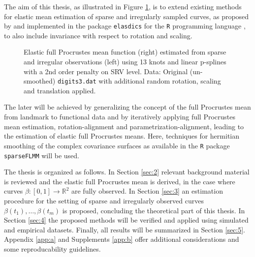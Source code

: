 The aim of this thesis, as illustrated in Figure \ref{fig:1-mean}, is to extend existing methods for elastic mean estimation of sparse and irregularly sampled curves, as proposed by \cite{Steyer2021} and implemented in the package \texttt{elasdics} \parencite{elasdics} for the \texttt{R} programming language \parencite{R}, to also include invariance with respect to rotation and scaling.
\begin{figure}
  \centering
  \begin{subfigure}{.48\textwidth}
    \centering
  \end{subfigure}\hfill%
  \begin{subfigure}{.48\textwidth}
    \centering
  \end{subfigure}
  \caption{Elastic full Procrustes mean function (right) estimated from sparse and irregular observations (left) using 13 knots and linear p-splines with a 2nd order penalty on SRV level. Data: Original (un-smoothed) \texttt{digits3.dat} with additional random rotation, scaling and translation applied.}
  \label{fig:1-mean}
\end{figure}
The later will be achieved by generalizing the concept of the full Procrustes mean from landmark to functional data and by iteratively applying full Procrustes mean estimation, rotation-alignment and parametrization-alignment, leading to the estimation of elastic full Procrustes means.
Here, techniques for hermitian smoothing of the complex covariance surfaces as available in the \texttt{R} package \texttt{sparseFLMM} \parencite{sparseFLMM} will be used.


The thesis is organized as follows.
In Section \ref{sec:2} relevant background material is reviewed and the elastic full Procrustes mean is derived, in the case where curves $\beta:[0,1] \rightarrow \mathbb{R}^2$ are fully observed. 
In Section \ref{sec:3} an estimation procedure for the setting of sparse and irregularly observed curves $\beta(t_1), \dots, \beta(t_m)$ is proposed, concluding the theoretical part of this thesis.
In Section \ref{sec:4} the proposed methods will be verified and applied using simulated and empirical datasets.
Finally, all results will be summarized in Section \ref{sec:5}.
Appendix \ref{app:a} and Supplements \ref{app:b} offer additional considerations and some reproducability guidelines.

\newpage
